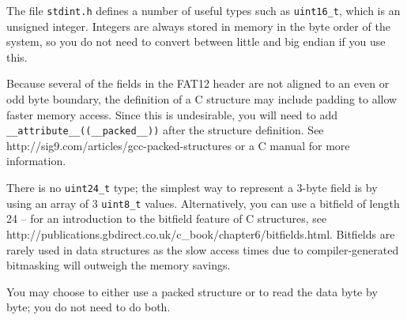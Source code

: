 \documentclass[letterpaper,10pt]{article}
\begin{document}
The file \verb=stdint.h= defines a number of useful types such as \verb=uint16_t=,
which is an unsigned integer. Integers are always stored in memory in the byte order
of the system, so you do not need to convert between little and big endian if you use this.

Because several of the fields in the FAT12 header are not aligned to an even or
odd byte boundary, the definition of a C structure may include padding to allow faster
memory access. Since this is undesirable, you will need to add \verb=__attribute__((__packed__))=
after the structure definition. See http://sig9.com/articles/gcc-packed-structures or a C manual
for more information.

There is no \verb=uint24_t= type; the simplest way to represent a 3-byte field is
by using an array of 3 \verb=uint8_t= values. Alternatively, you can use a bitfield
of length 24 -- for an introduction to the bitfield feature of C structures,
see http://publications.gbdirect.co.uk/c\_book/chapter6/bitfields.html. Bitfields are rarely used
in data structures as the slow access times due to compiler-generated bitmasking will outweigh the
memory savings.

You may choose to either use a packed structure or to read the data byte by byte; you do not need
to do both.
\end{document}
